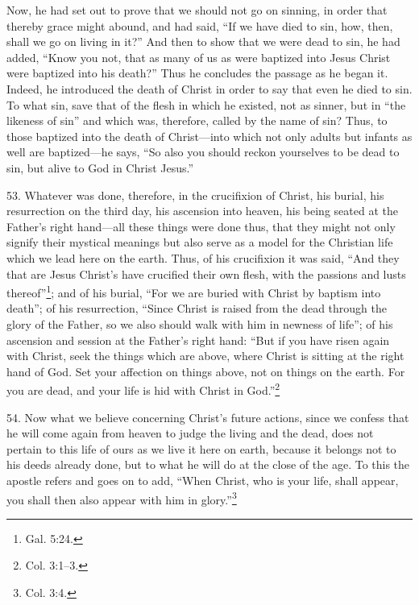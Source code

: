 Now, he had set out to prove that we should not go on sinning, in order that thereby grace might abound, and had said, ``If we have died to sin, how, then, shall we go on living in it?'' And then to show that we were dead to sin, he had added, ``Know you not, that as many of us as were baptized into Jesus Christ were baptized into his death?'' Thus he concludes the passage as he began it. Indeed, he introduced the death of Christ in order to say that even he died to sin. To what sin, save that of the flesh in which he existed, not as sinner, but in ``the likeness of sin'' and which was, therefore, called by the name of sin? Thus, to those baptized into the death of Christ—into which not only adults but infants as well are baptized—he says, ``So also you should reckon yourselves to be dead to sin, but alive to God in Christ Jesus.''

53. Whatever was done, therefore, in the crucifixion of Christ, his burial, his resurrection on the third day, his ascension into heaven, his being seated at the Father's right hand—all these things were done thus, that they might not only signify their mystical meanings but also serve as a model for the Christian life which we lead here on the earth. Thus, of his crucifixion it was said, ``And they that are Jesus Christ's have crucified their own flesh, with the passions and lusts thereof''\footnote{Gal. 5:24.}; and of his burial, ``For we are buried with Christ by baptism into death''; of his resurrection, ``Since Christ is raised from the dead through the glory of the Father, so we also should walk with him in newness of life''; of his ascension and session at the Father's right hand: ``But if you have risen again with Christ, seek the things which are above, where Christ is sitting at the right hand of God. Set your affection on things above, not on things on the earth. For you are dead, and your life is hid with Christ in God.''\footnote{Col. 3:1–3.}

54. Now what we believe concerning Christ's future actions, since we confess that he will come again from heaven to judge the living and the dead, does not pertain to this life of ours as we live it here on earth, because it belongs not to his deeds already done, but to what he will do at the close of the age. To this the apostle refers and goes on to add, ``When Christ, who is your life, shall appear, you shall then also appear with him in glory.''\footnote{Col. 3:4.}

